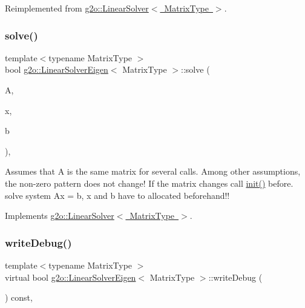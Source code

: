 Reimplemented from \mbox{\hyperlink{classg2o_1_1_linear_solver_a969c406ccacc38705b2a88f5ed23cb9a}{g2o\+::\+Linear\+Solver$<$ Matrix\+Type $>$}}.

\mbox{\label{classg2o_1_1_linear_solver_eigen_ae4ac566af324a238a31145c1e50b52e1}} 
\subsubsection{\texorpdfstring{solve()}{solve()}}
{\footnotesize\ttfamily template$<$typename Matrix\+Type $>$ \\
bool \mbox{\hyperlink{classg2o_1_1_linear_solver_eigen}{g2o\+::\+Linear\+Solver\+Eigen}}$<$ Matrix\+Type $>$\+::solve (\begin{DoxyParamCaption}\item[{const \mbox{\hyperlink{classg2o_1_1_sparse_block_matrix}{Sparse\+Block\+Matrix}}$<$ Matrix\+Type $>$ \&}]{A,  }\item[{double $\ast$}]{x,  }\item[{double $\ast$}]{b }\end{DoxyParamCaption})\hspace{0.3cm}{\ttfamily [inline]}, {\ttfamily [virtual]}}

Assumes that A is the same matrix for several calls. Among other assumptions, the non-\/zero pattern does not change! If the matrix changes call \mbox{\hyperlink{classg2o_1_1_linear_solver_eigen_a8fca4bb987dcbeb94a366b1532dee139}{init()}} before. solve system Ax = b, x and b have to allocated beforehand!! 

Implements \mbox{\hyperlink{classg2o_1_1_linear_solver_aa44b40826d50203c8ce2ff258c34e030}{g2o\+::\+Linear\+Solver$<$ Matrix\+Type $>$}}.

\mbox{\label{classg2o_1_1_linear_solver_eigen_ad9bccc1b4bcd3cc5e107ac09ac93cf4b}} 
\subsubsection{\texorpdfstring{write\+Debug()}{writeDebug()}}
{\footnotesize\ttfamily template$<$typename Matrix\+Type $>$ \\
virtual bool \mbox{\hyperlink{classg2o_1_1_linear_solver_eigen}{g2o\+::\+Linear\+Solver\+Eigen}}$<$ Matrix\+Type $>$\+::write\+Debug (\begin{DoxyParamCaption}{ }\end{DoxyParamCaption}) const\hspace{0.3cm}{\ttfamily [inline]}, {\ttfamily [virtual]}}



